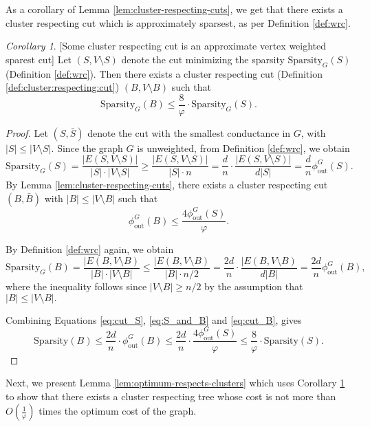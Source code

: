 \documentclass[letterpaper,11pt]{article}
\newcommand{\spp}{\text{Sparsity}}
\theoremstyle{plain}
\theoremstyle{definition}
\theoremstyle{remark}
\newtheorem{mycor}{Corollary}
\begin{document}
As a corollary of Lemma \ref{lem:cluster-respecting-cuts}, we get that there exists a cluster respecting cut which is approximately sparsest, as per Definition \ref{def:wrc}. 
\begin{mycor}\label{cor:wrc}[Some cluster respecting cut is an approximate vertex weighted sparest cut] 
  Let $(S, V \setminus S)$ denote the cut minimizing the sparsity $\spp_G(S)$ (Definition \ref{def:wrc}).
     Then there exists a cluster respecting cut
	(Definition \ref{def:cluster:respecting:cut}) $(B, V \setminus B)$ such that
    $$\spp_G(B) \leq  \frac{8}{\varphi} \cdot \spp_G(S)\text{.}$$
\end{mycor}
\begin{proof}
Let $(S, \bar S)$ denote the cut with the smallest conductance in $G$, with $|S| \leq |V \setminus S|$. Since the graph $G$ is unweighted, from Definition \ref{def:wrc}, we obtain 
    \begin{equation}\label{eq:cut_S}
        \spp_G(S) = \frac{|E(S,V \setminus S)|}{|S| \cdot |V \setminus S|} \geq \frac{|E(S,V \setminus S)|}{|S| \cdot n} = \frac{d}{n} \cdot \frac{|E(S,V \setminus S)|}{d|S| } =   \frac{d}{n} \phi_{\text{out}}^G(S). 
    \end{equation}
By Lemma \ref{lem:cluster-respecting-cuts}, there exists a cluster respecting cut $(B, \bar B)$ with $|B| \leq |V \setminus B|$ 
such that
\begin{equation}\label{eq:S_and_B}
    \phi_{\text{out}}^G(B) \leq \frac{4 \phi_{\text{out}}^G(S)}{\varphi}. 
\end{equation}

By Definition \ref{def:wrc} again, we obtain
\begin{equation}\label{eq:cut_B}
    \spp_G(B) = \frac{|E(B, V \setminus B)}{|B|\cdot  |V \setminus B|} \leq \frac{|E(B, V \setminus B)}{|B|\cdot n/2} = \frac{2d}{n}\cdot \frac{|E(B, V \setminus B)}{d|B|} = \frac{2d}{n}\phi_{\text{out}}^G(B),
\end{equation}
where the inequality follows since $ |V \setminus B | \geq n/2$ by the assumption that $|B| \leq |V \setminus B |.$

Combining Equations \eqref{eq:cut_S}, \eqref{eq:S_and_B} and \eqref{eq:cut_B}, gives 
$$ \spp(B) \leq \frac{2d}{n} \cdot \phi_{\text{out}}^G(B) \leq \frac{2d}{n} \cdot \frac{4 \phi_{\text{out}}^G(S)}{\varphi} \leq \frac{8}{\varphi}\cdot \spp(S).$$
\end{proof}

Next, we present Lemma \ref{lem:optimum-respects-clusters}  which uses Corollary \ref{cor:wrc} to show that there exists a cluster respecting tree whose cost is not more than $O\left(\frac{1}{\varphi} \right)$ times the optimum cost of the graph.
\end{document}
